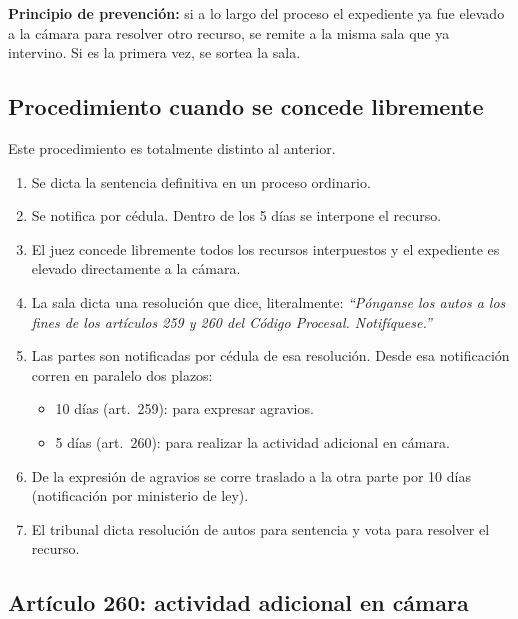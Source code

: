 \documentclass[12pt,oneside]{book}
\begin{document}
\begin{note}
\textbf{Principio de prevención:} si a lo largo del proceso el expediente ya fue elevado a la cámara para resolver otro recurso, se remite a la misma sala que ya intervino. Si es la primera vez, se sortea la sala.
\end{note}

\subsection{Procedimiento cuando se concede libremente}

Este procedimiento es totalmente distinto al anterior.

\begin{enumerate}
    \item Se dicta la sentencia definitiva en un proceso ordinario.
    \item Se notifica por cédula. Dentro de los 5 días se interpone el recurso.
    \item El juez concede libremente todos los recursos interpuestos y el expediente es elevado directamente a la cámara.
    \item La sala dicta una resolución que dice, literalmente: \textit{``Pónganse los autos a los fines de los artículos 259 y 260 del Código Procesal. Notifíquese.''}
    \item Las partes son notificadas por cédula de esa resolución. Desde esa notificación corren en paralelo dos plazos:
    \begin{itemize}
        \item 10 días (art.~259): para expresar agravios.
        \item 5 días (art.~260): para realizar la actividad adicional en cámara.
    \end{itemize}
    \item De la expresión de agravios se corre traslado a la otra parte por 10 días (notificación por ministerio de ley).
    \item El tribunal dicta resolución de autos para sentencia y vota para resolver el recurso.
\end{enumerate}

\subsection{Artículo 260: actividad adicional en cámara}
\end{document}
